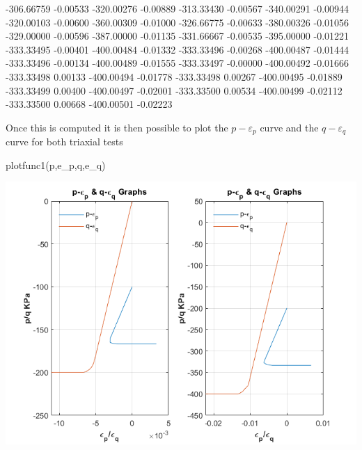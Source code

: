 \documentclass{article}
\begin{document}
\begin{matlaboutput}
-306.66759  -0.00533    -320.00276       -0.00889
-313.33430  -0.00567    -340.00291       -0.00944
-320.00103  -0.00600    -360.00309       -0.01000
-326.66775  -0.00633    -380.00326       -0.01056
-329.00000  -0.00596    -387.00000       -0.01135
-331.66667  -0.00535    -395.00000       -0.01221
-333.33495  -0.00401    -400.00484       -0.01332
-333.33496  -0.00268    -400.00487       -0.01444
-333.33496  -0.00134    -400.00489       -0.01555
-333.33497  -0.00000    -400.00492       -0.01666
-333.33498   0.00133    -400.00494       -0.01778
-333.33498   0.00267    -400.00495       -0.01889
-333.33499   0.00400    -400.00497       -0.02001
-333.33500   0.00534    -400.00499       -0.02112
-333.33500   0.00668    -400.00501       -0.02223
\end{matlaboutput}

\begin{par}
\begin{flushleft}
Once this is computed it is then possible to plot the $p-\varepsilon_{p}$ curve and the $q-\varepsilon_{q}$ curve for both triaxial tests  
\end{flushleft}
\end{par}

\begin{matlabcode}
plotfunc1(p,e_p,q,e_q)
\end{matlabcode}
\begin{center}
\includegraphics[width=\maxwidth{56.196688409433015em}]{figure_0}
\end{center}
\end{document}
